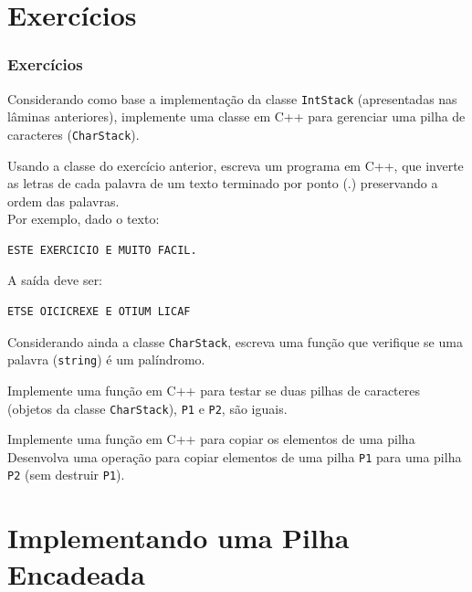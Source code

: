 \documentclass[aspectratio=169]{beamer}
\begin{document}
\section{Exercícios}

\begin{frame}[fragile]\frametitle{Exercícios}
\begin{enumerate}
{\small
	\item Considerando como base a implementação da classe \texttt{IntStack} (apresentadas nas lâminas anteriores), implemente uma classe em C++ para gerenciar uma pilha de caracteres (\texttt{CharStack}).
	\item Usando a classe do exercício anterior, escreva um programa em C++, que inverte as letras de cada palavra de um texto terminado por ponto (.) preservando a ordem das palavras.\\
Por exemplo, dado o texto:\\
\begin{verbatim}
ESTE EXERCICIO E MUITO FACIL.
\end{verbatim}
A saída deve ser:
\begin{verbatim}
ETSE OICICREXE E OTIUM LICAF
\end{verbatim}
\item Considerando ainda a classe \texttt{CharStack}, escreva uma função que verifique se uma palavra (\texttt{string}) é um palíndromo.
\item Implemente uma função em C++ para testar se duas pilhas de caracteres (objetos da classe \texttt{CharStack}), \texttt{P1} e \texttt{P2}, são iguais.
\item Implemente uma função em C++ para copiar os elementos de uma pilha Desenvolva uma operação para copiar elementos de uma pilha \texttt{P1} para uma pilha \texttt{P2} (sem destruir \texttt{P1}).
}
\end{enumerate}
\end{frame}

\section{Implementando uma Pilha Encadeada}
\end{document}
